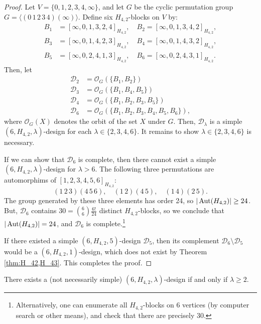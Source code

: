 \begin{proof}
Let $V = \{0,1,2,3,4,\infty\}$, and let $G$ be the cyclic permutation group $G = \langle (0 \, 1 \, 2 \, 3 \, 4)(\infty) \rangle$.
Define six $H_{4,2}$-blocks on $V$ by:
\begin{align*}
  B_1 &= [\infty, 0, 1, 3, 2, 4]_{H_{4,2}}, \quad
  B_2 = [\infty, 0, 1, 3, 4, 2]_{H_{4,2}}, \\
  B_3 &= [\infty, 0, 1, 4, 2, 3]_{H_{4,2}}, \quad
  B_4 = [\infty, 0, 1, 4, 3, 2]_{H_{4,2}}, \\
  B_5 &=  [\infty, 0, 2, 4, 1, 3]_{H_{4,2}}, \quad
  B_6 = [\infty, 0, 2, 4, 3, 1]_{H_{4,2}}.
\end{align*}
Then, let
\begin{align*}
  \mathcal{D}_2
  &= \mathcal{O}_G(\{B_1, B_2\}) \\
  \mathcal{D}_3
  &= \mathcal{O}_G(\{B_1, B_4, B_5\}) \\
  \mathcal{D}_4
  &= \mathcal{O}_G(\{B_1, B_2, B_3, B_5\}) \\
  \mathcal{D}_6
  &= \mathcal{O}_G(\{B_1, B_2, B_3, B_4, B_5, B_6\}),
\end{align*}
where $\mathcal{O}_G(X)$ denotes the orbit of the set $X$ under $G$.
Then, $\mathcal{D}_\lambda$ is a simple $(6, H_{4,2}, \lambda)$-design for each $\lambda \in \{2, 3, 4, 6\}$.
It remains to show $\lambda \in \{2, 3, 4, 6\}$ is necessary.

If we can show that $\mathcal{D}_6$ is complete, then there cannot exist a simple $(6, H_{4,2}, \lambda)$-design for $\lambda > 6$.
The following three permutations are automorphims of $[1, 2, 3, 4, 5, 6]_{H_{4,2}}$:
\[
  (1 \, 2 \, 3) (4 \, 5 \, 6), \quad (1 \, 2) (4 \, 5), \quad (1 \, 4) (2 \, 5).
\]
The group generated by these three elements has order 24, so $|\operatorname{Aut}(H_{4,2})| \geq 24$.
But, $\mathcal{D}_6$ contains $30 = {6 \choose 6} \frac{6!}{24}$ distinct $H_{4,2}$-blocks,
  so we conclude that $|\operatorname{Aut}(H_{4,2})| = 24$, and $\mathcal{D}_6$ is complete.\footnote{Alternatively,
  one can enumerate all $H_{4,2}$-blocks on 6 vertices (by computer search or other means), and check that there are precisely 30.}

If there existed a simple $(6, H_{4,2}, 5)$-design $\mathcal{D}_5$, then its complement
  $\mathcal{D}_6 \setminus \mathcal{D}_5$ would be a $(6, H_{4,2}, 1)$-design, which does not exist by Theorem \ref{thm:H_42,H_43}.
This completes the proof.
\end{proof}

\begin{theorem} \label{thm:H_42-6}
There exists a (not necessarily simple) $(6, H_{4,2}, \lambda)$-design if and only if $\lambda \geq 2$.
\end{theorem}

